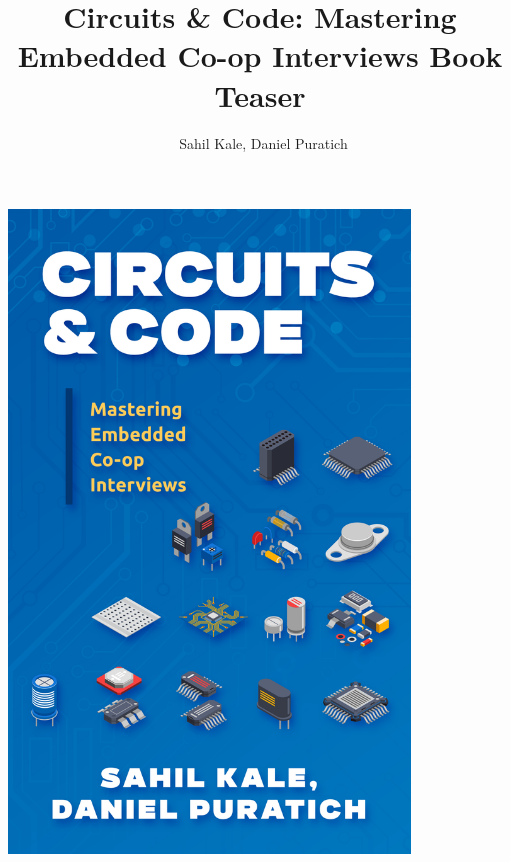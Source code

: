 \documentclass[letterpaper,11pt]{article}
\begin{document}
\begin{center}
    \includegraphics[width=0.8\textwidth]{images/cover.jpg}
\end{center}
\newpage

\title{Circuits \& Code: Mastering Embedded Co-op Interviews \newline Book Teaser}
\author{\textcopyright \ Sahil Kale, Daniel Puratich}
\setlength{\droptitle}{0.3\textheight} %
\maketitle %
\thispagestyle{empty} %
\newpage

\tableofcontents
\newpage


\newpage


\newpage

\newpage

\newpage


\printbibliography
\end{document}

